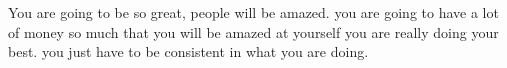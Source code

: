 You are going to be so great, people will be amazed.
you are going to have a lot of money so much that you will be amazed at yourself
you are really doing your best. you just have to be consistent in what you are doing.